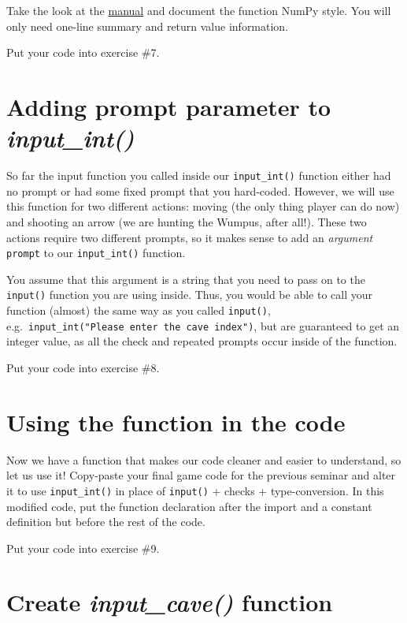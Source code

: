 \documentclass[
]{book}
\begin{document}
Take the look at the \href{https://numpydoc.readthedocs.io/en/latest/format.html\#docstring-standard}{manual} and document the function NumPy style. You will only need one-line summary and return value information.

Put your code into exercise \#7.

\hypertarget{adding-prompt-parameter-to-input_int}{%
\section{\texorpdfstring{Adding prompt parameter to \emph{input\_int()}}{Adding prompt parameter to input\_int()}}\label{adding-prompt-parameter-to-input_int}}

So far the input function you called inside our \texttt{input\_int()} function either had no prompt or had some fixed prompt that you hard-coded. However, we will use this function for two different actions: moving (the only thing player can do now) and shooting an arrow (we are hunting the Wumpus, after all!). These two actions require two different prompts, so it makes sense to add an \emph{argument} \texttt{prompt} to our \texttt{input\_int()} function.

You assume that this argument is a string that you need to pass on to the \texttt{input()} function you are using inside. Thus, you would be able to call your function (almost) the same way as you called \texttt{input()}, e.g.~\texttt{input\_int("Please\ enter\ the\ cave\ index")}, but are guaranteed to get an integer value, as all the check and repeated prompts occur inside of the function.

Put your code into exercise \#8.

\hypertarget{using-the-function-in-the-code}{%
\section{Using the function in the code}\label{using-the-function-in-the-code}}

Now we have a function that makes our code cleaner and easier to understand, so let us use it! Copy-paste your final game code for the previous seminar and alter it to use \texttt{input\_int()} in place of \texttt{input()} + checks + type-conversion. In this modified code, put the function declaration after the import and a constant definition but before the rest of the code.

Put your code into exercise \#9.

\hypertarget{create-input_cave-function}{%
\section{\texorpdfstring{Create \emph{input\_cave()} function}{Create input\_cave() function}}\label{create-input_cave-function}}
\end{document}
